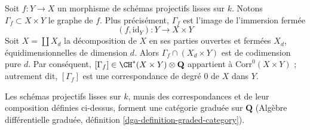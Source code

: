 \begin{example}
\label{example-graph-correspondence}
Soit $f : Y \to X$ un morphisme de schémas projectifs lisses sur $k$.
Notons $\Gamma_f \subset X \times Y$ le graphe de $f$. Plus précisément,
$\Gamma_f$ est l'image de l'immersion fermée
$$
(f, \text{id}_Y) : Y \longrightarrow X \times Y
$$
Soit $X = \coprod X_d$ la décomposition de $X$ en ses
parties ouvertes et fermées $X_d$, équidimensionnelles de dimension $d$.
Alors $\Gamma_f \cap (X_d \times Y)$ est de codimension pure $d$. Par conséquent,
$[\Gamma_f] \in \CH^*(X \times Y) \otimes \mathbf{Q}$
appartient à $\text{Corr}^0(X \times Y)$ ; autrement dit, $[\Gamma_f]$
est une correspondance de degré $0$ de $X$ dans $Y$.
\end{example}

\begin{lemma}
\label{lemma-category-correspondences}
Les schémas projectifs lisses sur $k$, munis des correspondances et
de leur composition définies ci-dessus, forment une catégorie graduée sur
$\mathbf{Q}$
(Algèbre différentielle graduée, définition \ref{dga-definition-graded-category}).
\end{lemma}

